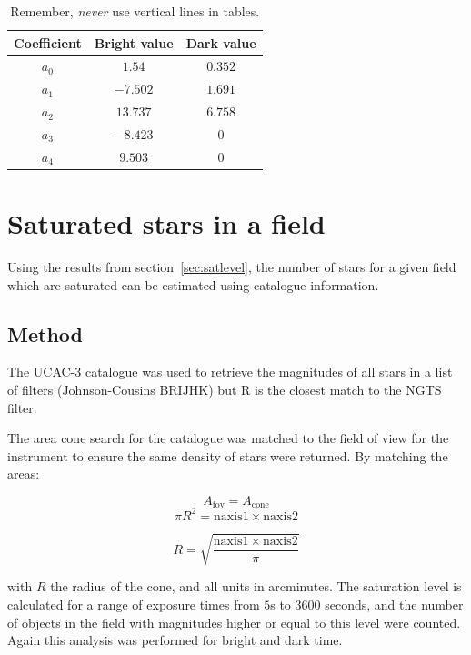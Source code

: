 \documentclass[11pt,a4paper]{report}
\begin{document}
\begin{table}[htbp]
   \centering
   \begin{tabular}{@{} ccc @{}} %
      \toprule
      Coefficient & Bright value & Dark value \\
            \midrule
	$a_{0}$ & $1.54$ & $0.352$ \\
      $a_{1}$ & $-7.502$ & $1.691$ \\
      $a_{2}$ & $13.737$ & $6.758$ \\
      $a_{3}$ & $-8.423$ & $0$ \\      
      $a_{4}$ & $9.503$ & $0$ \\
      \bottomrule
   \end{tabular}
   \caption{Remember, \emph{never} use vertical lines in tables.}
   \label{tab:coeffs}
\end{table}

\section{Saturated stars in a field}

Using the results from section~\ref{sec:satlevel}, the number of stars
for a given field which are saturated can be estimated using catalogue
information. 

\subsection{Method}

The UCAC-3 catalogue was used to retrieve the magnitudes of all stars
in a list of filters (Johnson-Cousins BRIJHK) but R is the closest match 
to the NGTS filter. 

The area cone search for the catalogue was matched to the field of view
for the instrument to ensure the same density of stars were returned. By
matching the areas:

\[
    A_{\mathrm{fov}} = A_{\mathrm{cone}}
    \]
\[
    \pi R^2 = \mathrm{naxis1} \times \mathrm{naxis2}
    \]

\[
    R = \sqrt{\frac{\mathrm{naxis1} \times \mathrm{naxis2}}{\pi}}
    \]

with $R$ the radius of the cone, and all units in arcminutes. The
saturation level is calculated for a range of exposure times from $5$s
to $3600$ seconds, and the number of objects in the field with
magnitudes higher or equal to this level were counted. Again this
analysis was performed for bright and dark time.
\end{document}
